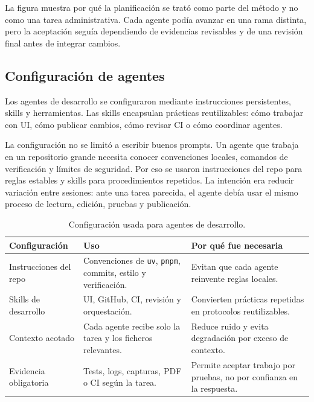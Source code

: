 La figura muestra por qué la planificación se trató como parte del método y no
como una tarea administrativa. Cada agente podía avanzar en una rama distinta,
pero la aceptación seguía dependiendo de evidencias revisables y de una revisión
final antes de integrar cambios.

\subsection{Configuración de agentes}

Los agentes de desarrollo se configuraron mediante instrucciones persistentes,
skills y herramientas. Las skills encapsulan prácticas reutilizables: cómo
trabajar con UI, cómo publicar cambios, cómo revisar CI o cómo coordinar
agentes.

La configuración no se limitó a escribir buenos prompts. Un agente que trabaja
en un repositorio grande necesita conocer convenciones locales, comandos de
verificación y límites de seguridad. Por eso se usaron instrucciones del repo
para reglas estables y skills para procedimientos repetidos. La intención era
reducir variación entre sesiones: ante una tarea parecida, el agente debía usar
el mismo proceso de lectura, edición, pruebas y publicación.

\begin{table}[H]
\begin{center}
\small
\begin{tabular}{|p{3.1cm}|p{4.4cm}|p{4.8cm}|} \hline
\textbf{Configuración} & \textbf{Uso} & \textbf{Por qué fue necesaria} \\ \hline
Instrucciones del repo & Convenciones de \texttt{uv}, \texttt{pnpm}, commits, estilo y verificación. & Evitan que cada agente reinvente reglas locales. \\ \hline
Skills de desarrollo & UI, GitHub, CI, revisión y orquestación. & Convierten prácticas repetidas en protocolos reutilizables. \\ \hline
Contexto acotado & Cada agente recibe solo la tarea y los ficheros relevantes. & Reduce ruido y evita degradación por exceso de contexto. \\ \hline
Evidencia obligatoria & Tests, logs, capturas, PDF o CI según la tarea. & Permite aceptar trabajo por pruebas, no por confianza en la respuesta. \\ \hline
\end{tabular}
\caption{Configuración usada para agentes de desarrollo.}
\end{center}
\end{table}

